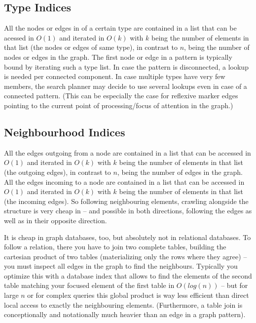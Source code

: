 \subsection{Type Indices}
All the nodes or edges in \GrG{} of a certain type are contained in a list that can be acessed in $O(1)$ and iterated in $O(k)$ with $k$ being the number of elements in that list (the nodes or edges of same type), in contrast to $n$, being the number of nodes or edges in the graph.
The first node or edge in a pattern is typically bound by iterating such a type list.
In case the pattern is disconnected, a lookup is needed per connected component.
In case multiple types have very few members, the search planner may decide to use several lookups even in case of a connected pattern.
(This can be especially the case for reflexive marker edges pointing to the current point of processing/focus of attention in the graph.)

\subsection{Neighbourhood Indices}
All the edges outgoing from a node are contained in a list that can be accessed in $O(1)$ and iterated in $O(k)$ with $k$ being the number of elements in that list (the outgoing edges), in contrast to $n$, being the number of edges in the graph.
All the edges incoming to a node are contained in a list that can be accessed in $O(1)$ and iterated in $O(k)$ with $k$ being the number of elements in that list (the incoming edges).
So following neighbouring elements, crawling alongside the structure is very cheap in \GrG{ } -- and possible in both directions, following the edges as well as in their opposite direction.

It is cheap in graph databases, too, but absolutely not in relational databases.
To follow a relation, there you have to join two complete tables, building the cartesian product of two tables (materializing only the rows where they agree) -- you must inspect all edges in the graph to find the neighbours.
Typically you optimize this with a database index that allows to find the elements of the second table matching your focused element of the first table in $O(log(n))$ -- but for large $n$ or for complex queries this global product is way less efficient than direct local access to exactly the neighbouring elements.
(Furthermore, a table join is conceptionally and notationally much heavier than an edge in a graph pattern).

